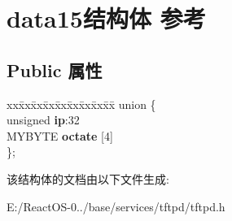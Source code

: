 \hypertarget{structdata15}{}\section{data15结构体 参考}
\label{structdata15}
\subsection*{Public 属性}
\begin{DoxyCompactItemize}
\item 
\mbox{\label{structdata15_a7add1f12230b4ac2193c740faec952ee}} 
\begin{tabbing}
xx\=xx\=xx\=xx\=xx\=xx\=xx\=xx\=xx\=\kill
union \{\\
\>unsigned {\bfseries ip}:32\\
\>MYBYTE {\bfseries octate} \mbox{[}4\mbox{]}\\
\}; \\

\end{tabbing}\end{DoxyCompactItemize}


该结构体的文档由以下文件生成\+:\begin{DoxyCompactItemize}
\item 
E\+:/\+React\+O\+S-\/0../base/services/tftpd/tftpd.\+h\end{DoxyCompactItemize}
